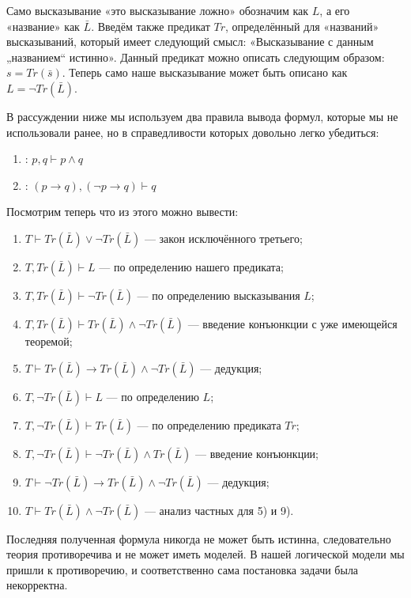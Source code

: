 Само высказывание «это высказывание ложно» обозначим как $L$, а его «название» как $\bar{L}$. Введём также предикат $Tr$, определённый для «названий» высказываний, который имеет следующий смысл: «Высказывание с данным „названием“ истинно». Данный предикат можно описать следующим образом: $s = Tr(\bar{s})$. Теперь само наше высказывание может быть описано как $L = \neg Tr(\bar{L})$.

В рассуждении ниже мы используем два правила вывода формул, которые мы не использовали ранее, но в справедливости которых довольно легко убедиться:

\begin{enumerate}
\item {}: $p, q\vdash p\land q$
\item {}: $(p\to q), (\neg p\to q)\vdash q$
\end{enumerate}

Посмотрим теперь что из этого можно вывести:

\begin{enumerate}
\item  $T\vdash Tr(\bar{L})\vee\neg Tr(\bar{L})$ — закон исключённого третьего;
\item  $T, Tr(\bar{L})\vdash L$ — по определению нашего предиката;
\item  $T, Tr(\bar{L})\vdash \neg Tr(\bar{L})$ — по определению высказывания $L$;
\item  $T, Tr(\bar{L})\vdash Tr(\bar{L})\wedge\neg Tr(\bar{L})$ — введение конъюнкции с уже имеющейся теоремой;
\item  $T\vdash Tr(\bar{L})\rightarrow Tr(\bar{L})\wedge\neg Tr(\bar{L})$ — дедукция;
\item  $T, \neg Tr(\bar{L})\vdash L$ — по определению $L$;
\item  $T, \neg Tr(\bar{L}) \vdash Tr(\bar{L})$ — по определению предиката $Tr$;
\item  $T, \neg Tr(\bar{L})\vdash \neg Tr(\bar{L}) \wedge Tr(\bar{L})$ — введение конъюнкции;
\item  $T\vdash \neg Tr(\bar{L})\rightarrow Tr(\bar{L})\wedge\neg Tr(\bar{L})$ — дедукция;
\item  $T\vdash Tr(\bar{L})\wedge\neg Tr(\bar{L})$ — анализ частных для 5) и 9).
\end{enumerate}

Последняя полученная формула никогда не может быть истинна, следовательно теория противоречива и не может иметь моделей. В нашей логической модели мы пришли к противоречию, и соответственно сама постановка задачи была некорректна.

